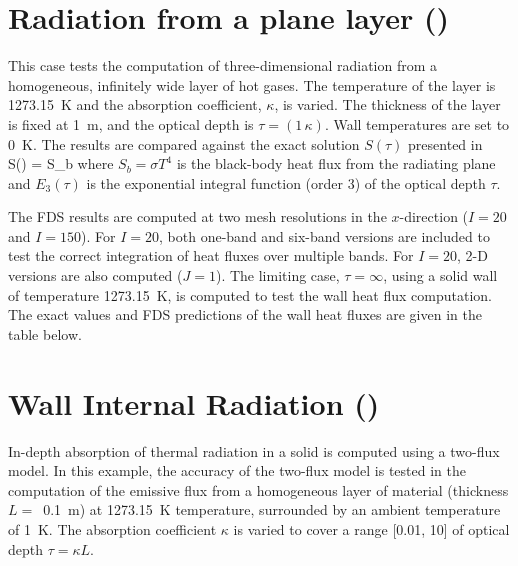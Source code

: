 \documentclass[11pt]{book}
\begin{document}
\clearpage

\section{Radiation from a plane layer (\texorpdfstring{}{radiation\_plane\_layer})}
\label{radiation_plane_layer}

This case tests the computation of three-dimensional radiation from a homogeneous, infinitely wide layer of hot gases.  The temperature of
the layer is 1273.15~K and the absorption coefficient, $\kappa$, is varied. The thickness of the layer is fixed at 1~m, and the optical depth is $\tau = (1 \, \kappa)$.
Wall temperatures are set to 0~K. The results are compared against the exact solution $S(\tau)$ presented in~\cite{Zeldovich:1}
\be S(\tau) = S_b \ee
where $S_b = \sigma T^4$ is the black-body heat flux from the radiating plane and $E_3(\tau)$ is the exponential
integral function (order 3) of the optical depth $\tau$.

The FDS results are computed at two mesh resolutions in the $x$-direction ($I=20$ and $I=150$). For $I=20$, both one-band and six-band versions are
included to test the correct integration of heat fluxes over multiple bands. For $I=20$, 2-D versions are also computed ($J=1$). The limiting case, $\tau=\infty$,
using a solid wall of temperature 1273.15~K, is computed to test the wall heat flux computation. The exact values and FDS predictions of
the wall heat fluxes are given in the table below.



\clearpage
\section{Wall Internal Radiation (\texorpdfstring{}{wall\_internal\_radiation}) }
\label{wall_internal_radiation}


In-depth absorption of thermal radiation in a solid is computed using a two-flux model.  In this example, the accuracy of the two-flux model
is tested in the computation of the emissive flux from a homogeneous layer of material (thickness $L=$~0.1~m) at 1273.15~K temperature,
surrounded by an ambient temperature of 1~K. The absorption coefficient $\kappa$ is varied to cover a range [0.01, 10] of optical depth
$\tau = \kappa L$.
\end{document}
